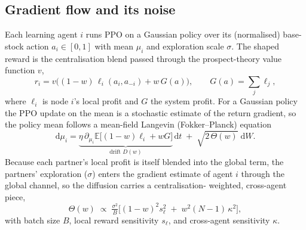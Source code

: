 \documentclass[letterpaper]{article}
\theoremstyle{plain}
\begin{document}
\subsection{Gradient flow and its noise}
Each learning agent $i$ runs PPO on a Gaussian policy over its (normalised)
base-stock action $a_i\in[0,1]$ with mean $\mu_i$ and exploration scale
$\sigma$. The shaped reward is the centralisation blend passed through the
prospect-theory value function $v$,
\begin{equation}
  r_i = v\!\big((1-w)\,\ell_i(a_i,a_{-i}) + w\,G(a)\big),
  \qquad G(a)=\textstyle\sum_j \ell_j ,
  \label{eq:blend}
\end{equation}
where $\ell_i$ is node $i$'s local profit and $G$ the system profit. For a
Gaussian policy the PPO update on the mean is a stochastic estimate of the
return gradient, so the policy mean follows a mean-field Langevin
(Fokker--Planck) equation
\begin{equation}
  \mathrm{d}\mu_i = \underbrace{\eta\,\partial_{\mu_i}\mathbb{E}\big[(1{-}w)\ell_i + wG\big]}_{\text{drift } D(w)}\,\mathrm{d}t
  \;+\; \sqrt{2\,\Theta(w)}\;\mathrm{d}W .
  \label{eq:langevin}
\end{equation}
Because each partner's local profit is itself blended into the global term,
the partners' exploration ($\sigma$) enters the gradient estimate of agent
$i$ through the global channel, so the diffusion carries a centralisation-
weighted, cross-agent piece,
\begin{equation}
  \Theta(w)\;\propto\;\tfrac{\sigma^2}{B}\big[(1{-}w)^2 s_\ell^2 \;+\; w^2 (N{-}1)\,\kappa^2\big],
  \label{eq:diffusion}
\end{equation}
with batch size $B$, local reward sensitivity $s_\ell$, and cross-agent
sensitivity $\kappa$.
\end{document}
